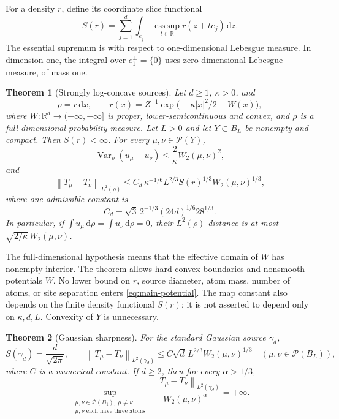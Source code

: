 \documentclass[11pt]{article}
\numberwithin{equation}{section}
\newtheorem{theorem}{Theorem}[section]
\theoremstyle{remark}
\newcommand{\R}{\mathbb R}
\newcommand{\Prob}{\mathcal P}
\newcommand{\Var}{\operatorname{Var}}
\newcommand{\esssup}{\operatorname*{ess\,sup}}
\newcommand{\dd}{\,\mathrm d}
\newcommand{\norm}[1]{\left\lVert #1\right\rVert}
\begin{document}
For a density $r$, define its coordinate slice functional
\begin{equation}\label{eq:slice-functional}
 S(r)=\sum_{j=1}^d\int_{e_j^\perp}
       \esssup_{t\in\R} r(z+t e_j)\dd z.
\end{equation}
The essential supremum is with respect to one-dimensional Lebesgue measure. In dimension one, the integral over $e_1^\perp=\{0\}$ uses zero-dimensional Lebesgue measure, of mass one.

\begin{theorem}[Strongly log-concave sources]\label{thm:strong}
Let $d\ge1$, $\kappa>0$, and
\begin{equation}\label{eq:strong-density}
 \rho=r\dd x,\qquad
 r(x)=Z^{-1}\exp\bigl(-\kappa|x|^2/2-W(x)\bigr),
\end{equation}
where $W:\R^d\to(-\infty,+\infty]$ is proper, lower-semicontinuous and convex, and $\rho$ is a full-dimensional probability measure. Let $L>0$ and let $Y\subset B_L$ be nonempty and compact. Then $S(r)<\infty$. For every $\mu,\nu\in\Prob(Y)$,
\begin{equation}\label{eq:main-potential}
 \Var_\rho(u_\mu-u_\nu)
 \le \frac{2}{\kappa}W_2(\mu,\nu)^2,
\end{equation}
and
\begin{equation}\label{eq:main-map}
 \norm{T_\mu-T_\nu}_{L^2(\rho)}
 \le C_d\,\kappa^{-1/6}L^{2/3}S(r)^{1/3}
          W_2(\mu,\nu)^{1/3},
\end{equation}
where one admissible constant is
\begin{equation}\label{eq:main-constant}
 C_d=\sqrt3\,2^{-1/3}(24d)^{1/6}28^{1/3}.
\end{equation}
In particular, if $\int u_\mu\dd\rho=\int u_\nu\dd\rho=0$, their $L^2(\rho)$ distance is at most $\sqrt{2/\kappa}\,W_2(\mu,\nu)$.
\end{theorem}

The full-dimensional hypothesis means that the effective domain of $W$ has nonempty interior. The theorem allows hard convex boundaries and nonsmooth potentials $W$. No lower bound on $r$, source diameter, atom mass, number of atoms, or site separation enters \eqref{eq:main-potential}. The map constant also depends on the finite density functional $S(r)$; it is not asserted to depend only on $\kappa,d,L$. Convexity of $Y$ is unnecessary.

\begin{theorem}[Gaussian sharpness]\label{thm:sharp}
For the standard Gaussian source $\gamma_d$,
\[
 S(\gamma_d)=\frac{d}{\sqrt{2\pi}},\qquad
 \norm{T_\mu-T_\nu}_{L^2(\gamma_d)}
 \le C\sqrt d\,L^{2/3}W_2(\mu,\nu)^{1/3}
 \quad(\mu,\nu\in\Prob(B_L)),
\]
where $C$ is a numerical constant. If $d\ge2$, then for every $\alpha>1/3$,
\begin{equation}\label{eq:sharp-claim}
 \sup_{\substack{\mu,\nu\in\Prob(B_1),\ \mu\ne\nu\\
                  \mu,\nu\text{ each have three atoms}}}
 \frac{\norm{T_\mu-T_\nu}_{L^2(\gamma_d)}}{W_2(\mu,\nu)^\alpha}
 =+\infty.
\end{equation}
\end{theorem}
\end{document}
